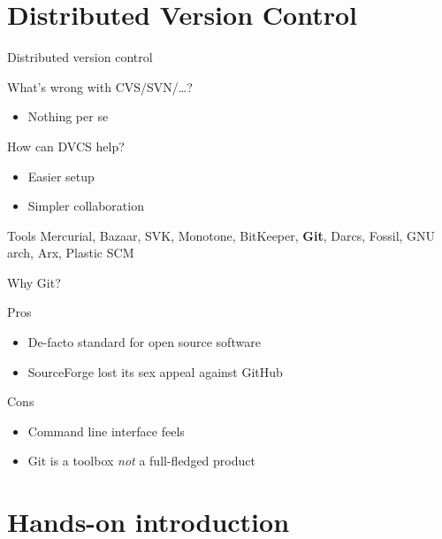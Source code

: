 \documentclass[18pt]{beamer}
\begin{document}
\section{Distributed Version Control}

\begin{frame}{Distributed version control}
  \begin{block}{What's wrong with CVS/SVN/\ldots?}
    \begin{itemize}
      \item Nothing per se
    \end{itemize}
  \end{block}

  \begin{block}{How can DVCS help?}
    \begin{itemize}
      \item Easier setup
      \item Simpler collaboration
    \end{itemize}
  \end{block}
\end{frame}
\begin{frame}{Tools}
  Mercurial, Bazaar, SVK, Monotone, BitKeeper, \textbf{Git}, Darcs, Fossil, GNU
  arch, Arx, Plastic SCM
\end{frame}
\begin{frame}{Why Git?}
  \begin{block}{Pros}
    \begin{itemize}
      \item De-facto standard for open source software
      \item SourceForge lost its sex appeal against GitHub
    \end{itemize}
  \end{block}

  \begin{block}{Cons}
    \begin{itemize}
      \item Command line interface feels
      \item Git is a toolbox \emph{not} a full-fledged product
    \end{itemize}
  \end{block}
\end{frame}

\section{Hands-on introduction}
\end{document}
